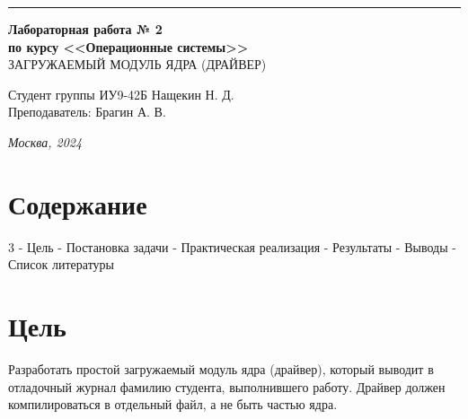 \documentclass[a4paper, 14pt]{extarticle}
\begin{document}
\begin{titlepage}
\vspace*{-16pt}
\hspace{30pt}\rule{0.866\textwidth}{0.4pt}
  
\vspace{11em}

\begin{center}
\Large {\bf Лабораторная работа № 2} \\ 
\large {\bf по курсу <<Операционные системы>>} \\ 
{ЗАГРУЖАЕМЫЙ МОДУЛЬ ЯДРА (ДРАЙВЕР)} \\
\end{center}\normalsize

\vspace{8em}


\begin{flushright}
  {Студент группы ИУ9-42Б Нащекин Н. Д.\hspace*{15pt} \\
  \vspace{2ex}
  Преподаватель: Брагин А. В.\hspace*{15pt}}
\end{flushright}

\bigskip

\vfill
 

\begin{center}
\textsl{Москва, 2024}
\end{center}
\end{titlepage}

\renewcommand{\ttdefault}{pcr}

\setlength{\tabcolsep}{3pt}
\newpage
\setcounter{page}{2}

\section{Содержание}
\begin{flushleft}
3 - Цель  - Постановка задачи  - Практическая реализация  - Результаты  - Выводы  - Список литературы \newline
\end{flushleft}
\pagebreak

\section{Цель}
\begin{flushleft}
Разработать простой загружаемый модуль ядра (драйвер),
который выводит в отладочный журнал фамилию студента, выполнившего
работу. Драйвер должен компилироваться в отдельный файл, а не быть частью
ядра.

\end{flushleft}
\pagebreak
\end{document}
